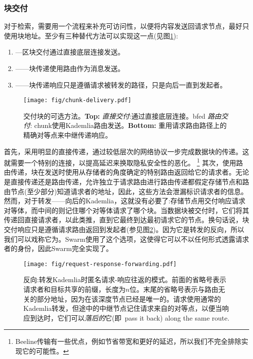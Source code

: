 \subsubsection{块交付}

对于检索，需要用一个流程来补充可访问性，以便将内容发送回请求节点，最好只使用块地址。至少有三种替代方法可以实现这一点(见图\ref{fig:chunk-delivery}):

\begin{enumerate}
    \item {}—区块交付通过直接底层连接发送。 
    \item {}——块传递使用路由作为消息发送。
    \item {}——块传递响应只是遵循请求被转发的路径，只是向后一直到发起者。
\end{enumerate}


\begin{figure}[htbp]
   \centering
   \texttt{[image: fig/chunk-delivery.pdf]}
   \caption[交付块的可选方法:直接、路由和向后\statusgreen]{交付块的可选方法。\textbf{Top:} \emph{直接交付}:通过直接底层连接。bfed \emph{路由交付}: chunk使用Kademlia路由发送。\textbf{Bottom:} 重用请求路由路径上的精确对等点来中继传递响应。}
   \label{fig:chunk-delivery}
\end{figure}

首先，采用明显的直接传递，通过较低层次的网络协议一步完成数据块的传递。这就需要一个特别的连接，以提高延迟来换取隐私安全性的恶化。%
%
\footnote{Beeline传输有一些优点，例如节省带宽和更好的延迟，所以我们不完全排除实现它的可能性。 
}
其次，使用路由传递，块在发送时使用从存储者的角度确定的特别路由返回给它的请求者。无论是直接传递还是路由传递，允许独立于请求路由进行路由传递都假定存储节点和路由节点(至少部分)知道请求者的地址，因此，这些方法会泄漏标识请求者的信息。然而，对于转发——向后的Kademlia，这就没有必要了:存储节点用交付响应请求对等体，而中间的则记住哪个对等体请求了哪个块。当数据块被交付时，它们将其传递回直接请求者，以此类推，直到它最终到达最初请求它的节点。换句话说，块交付响应只是遵循请求路由返回到发起者(参见图\ref{fig:request-response})。因为它是转发的反向，所以我们可以戏称它为。Swarm使用了这个选项，这使得它可以不以任何形式透露请求者的身份，因此Swarm完全实现了。 

\begin{figure}[htbp]
   \centering
   \texttt{[image: fig/request-response-forwarding.pdf]}
   \caption[反向:转发Kademlia 时匿名请求-响应往返的模式\statusgreen]{反向:转发Kademlia时匿名请求-响应往返的模式。前面的省略号表示请求者和目标共享的前缀，长度为$n$位。末尾的省略号表示与路由无关的部分地址，因为在该深度节点已经是唯一的。请求使用通常的Kademlia转发，但途中的中继节点记住请求来自的对等点，以便当响应到达时，它们可以\emph{落后的}它(即\ pass it back) along the same route.}
   \label{fig:request-response}
\end{figure}

